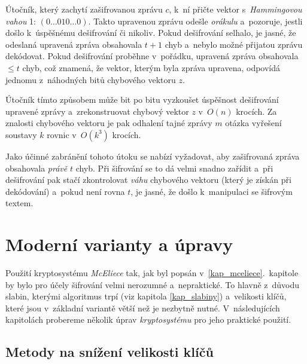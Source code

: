 \documentclass[thesis=M,czech,hidelinks]{FITthesis}[2012/06/26]
\newcommand{\0}{{\textcolor[gray]{0.75}{0}}}
\begin{document}
Útočník, který zachytí zašifrovanou zprávu $c$, k~ní přičte vektor
s~\emph{Hammingovou vahou} 1: $\left(0\ldots010\ldots0\right)$. Takto upravenou
zprávu odešle \emph{orákulu} a~pozoruje, jestli došlo k~úspěšnému dešifrování či
nikoliv. Pokud dešifrování selhalo, je jasné, že odeslaná upravená zpráva
obsahovala $t+1$ chyb a~nebylo možné přijatou zprávu dekódovat. Pokud
dešifrování proběhne v~pořádku, upravená zpráva obsahovala $\leq t$ chyb, což
znamená, že vektor, kterým byla zpráva upravena, odpovídá jednomu z~náhodných
bitů chybového vektoru $z$.

Útočník tímto způsobem může bit po bitu vyzkoušet úspěšnost dešifrování upravené
zprávy a~zrekonstruovat chybový vektor $z$ v~$O\left( n \right)$ krocích. Za
znalosti chybového vektoru je pak odhalení tajné zprávy $m$ otázka vyřešení
soustavy $k$ rovnic v~$O\left( k^3 \right)$ krocích.

Jako účinné zabránění tohoto útoku se nabízí vyžadovat, aby zašifrovaná zpráva
obsahovala \emph{právě} $t$ chyb. Při šifrování se to dá velmi snadno zařídit
a~při dešifrování pak stačí zkontrolovat \emph{váhu} chybového vektoru (který je
získán při dekódování) a~pokud není rovna $t$, je jasné, že došlo k~manipulaci
se šifrovým textem.





\chapter{Moderní varianty a úpravy}\label{kap_upravy}

Použití kryptosystému \emph{McEliece} tak, jak byl popsán
v~\ref{kap_mceliece}.~kapitole by bylo pro účely šifrování velmi nerozumné
a~nepraktické. To hlavně z~důvodu slabin, kterými algoritmus trpí (viz kapitola
\ref{kap_slabiny}) a~velikosti klíčů, které jsou v~základní variantě větší než
je nezbytně nutné.  V~následujících kapitolách probereme několik úprav
\emph{kryptosystému} pro jeho praktické použití.



\section{Metody na snížení velikosti klíčů}\label{kap_snizeni_velikosti_klicu}
\end{document}
